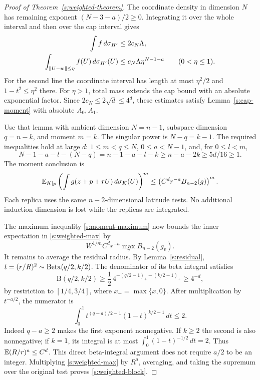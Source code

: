 \begin{proof}[Proof of Theorem~\ref{s:weighted-theorem}]
The coordinate density in dimension \(N\) has remaining exponent
\((N-3-a)/2\ge0\). Integrating it over the whole interval and then
over the cap interval gives
\begin{align}
 \int f\,d\sigma_{H'}&\le2c_N\Lambda,\label{s:weighted-total}\\
 \int_{\left\lVert U-w\right\rVert\le\eta} f(U)\,d\sigma_{H'}(U)
 &\le c_N\Lambda\eta^{N-1-a}
 \qquad(0<\eta\le1).\label{s:weighted-cap}
\end{align}
For the second line the coordinate interval has length at most
\(\eta^2/2\) and \(1-t^2\le\eta^2\) there. For \(\eta>1\), total
mass extends the cap bound with an absolute exponential factor.
Since \(2c_N\le2\sqrt d\le4^d\), these estimates satisfy
Lemma~\ref{s:cap-moment} with absolute \(A_0,A_1\).

Use that lemma with ambient dimension \(N=n-1\), subspace dimension
\(q=n-k\), and moment \(m=k\). The singular power is
\(N-q=k-1\). The required inequalities hold at large \(d\):
\(1\le m<q\le N\), \(0\le a<N-1\), and, for
\(0\le l<m\),
\[
 N-1-a-l-(N-q)
 =n-1-a-l-k
 \ge n-a-2k
 \ge5d/16\ge1.
\]
The moment conclusion is
\begin{equation}\label{s:weighted-moment}
 \mathbb E_{K\mid p}\left(\int g(z+p+rU)\,d\sigma_K(U)\right)^m
 \le\left(C^d r^{-a}B_{n-2}(g)\right)^m.
\end{equation}
Each replica uses the same \(n-2\)-dimensional latitude tests.
No additional induction dimension is lost while the replicas are
integrated.

The maximum inequality \eqref{s:moment-maximum} now bounds the inner
expectation in \eqref{s:weighted-max} by
\[
 W^{1/m}C^d r^{-a}\max_v B_{n-2}(g_v).
\]
It remains to average the residual radius. By
Lemma~\ref{s:residual}, \(t=(r/R)^2\sim\operatorname{Beta}(q/2,k/2)\).
The denominator of its beta integral satisfies
\[
 \mathrm B(q/2,k/2)
 \ge \frac12\,4^{-(q/2-1)_+-(k/2-1)_+}
 \ge 4^{-d},
\]
by restriction to \([1/4,3/4]\), where \(x_+=\max\{x,0\}\).
After multiplication by \(t^{-a/2}\), the numerator is
\begin{equation}\label{s:weighted-beta-integral}
 \int_0^1 t^{(q-a)/2-1}(1-t)^{k/2-1}\,dt\le2.
\end{equation}
Indeed \(q-a\ge2\) makes the first exponent nonnegative. If \(k\ge2\)
the second is also nonnegative; if \(k=1\), its integral is at most
\(\int_0^1(1-t)^{-1/2}\,dt=2\). Thus
\(\mathbb E(R/r)^a\le C^d\). This direct beta-integral argument does not
require \(a/2\) to be an integer. Multiplying
\eqref{s:weighted-max} by \(R^a\), averaging, and taking the supremum
over the original test proves \eqref{s:weighted-block}.
\end{proof}

